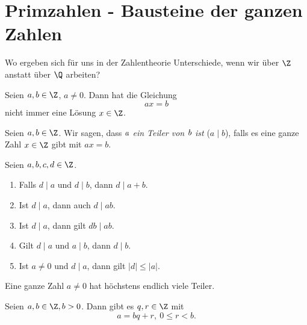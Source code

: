 \chapter{Primzahlen - Bausteine der ganzen Zahlen}


Wo ergeben sich für uns in der Zahlentheorie Unterschiede, wenn wir über $\Z$ anstatt über $\Q$ arbeiten?

\begin{exmp*}
	Seien $a,b \in \Z$, $a\neq 0$. Dann hat die Gleichung
	\[ ax = b \]
	nicht immer eine Lösung $x \in \Z$.
\end{exmp*}

\begin{defn*}[Teiler]
	Seien $a,b \in \Z$. Wir sagen, dass \emph{$\emph{a}$ ein Teiler von $\emph{b}$ ist} ($a \mid b$), falls es eine ganze Zahl $x \in \Z$ gibt mit $ax = b$.
\end{defn*}

\begin{lem}\autolabel
	Seien $a,b,c,d \in \Z$.
	\begin{enumerate}[label={\roman*})]
		\item Falls $d \mid a$ und $d \mid b$, dann $d \mid a+b$.
		\item Ist $d \mid a$, dann auch $d \mid ab$.
		\item Ist $d \mid a$, dann gilt $db \mid ab$.
		\item Gilt $d \mid a$ und $a \mid b$, dann $d \mid b$.
		\item Ist $a \neq 0$ und $d \mid a$, dann gilt $|d| \leq |a|$.
	\end{enumerate}
\end{lem}

\begin{rem*}
	Eine ganze Zahl $a \neq 0$ hat höchstens endlich viele Teiler.
\end{rem*}

\begin{thm}\autolabel
	Seien $a,b \in \Z, b > 0$. Dann gibt es $q,r \in \Z$ mit
	\[ a = bq + r, \ 0 \leq r < b. \]
\end{thm}

